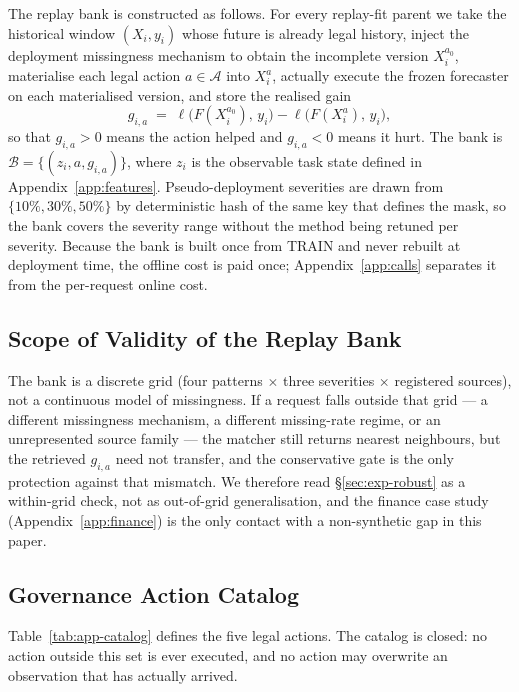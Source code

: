 \documentclass{article}
\newcommand{\calA}{\mathcal{A}}
\newcommand{\calB}{\mathcal{B}}
\newcommand{\loss}{\ell}
\begin{document}
The replay bank is constructed as follows. For every replay-fit parent we take the
historical window $(X_i, y_i)$ whose future is already legal history, inject the deployment
missingness mechanism to obtain the incomplete version $X_i^{a_0}$, materialise each legal
action $a \in \calA$ into $X_i^{a}$, actually execute the frozen forecaster on each
materialised version, and store the realised gain
\begin{equation}
  g_{i,a} \;=\; \loss\big(F(X_i^{a_0}),\, y_i\big) - \loss\big(F(X_i^{a}),\, y_i\big),
  \label{eq:app-gain}
\end{equation}
so that $g_{i,a} > 0$ means the action helped and $g_{i,a} < 0$ means it hurt. The bank is
$\calB = \{(z_i, a, g_{i,a})\}$, where $z_i$ is the observable task state defined in
Appendix~\ref{app:features}. Pseudo-deployment severities are drawn from
$\{10\%, 30\%, 50\%\}$ by deterministic hash of the same key that defines the mask, so the
bank covers the severity range without the method being retuned per severity. Because the
bank is built once from TRAIN and never rebuilt at deployment time, the offline cost is
paid once; Appendix~\ref{app:calls} separates it from the per-request online cost.

\subsection{Scope of Validity of the Replay Bank}
\label{app:scope}

The bank is a discrete grid (four patterns $\times$ three severities $\times$ registered
sources), not a continuous model of missingness. If a request falls outside that grid --- a
different missingness mechanism, a different missing-rate regime, or an unrepresented source
family --- the matcher still returns nearest neighbours, but the retrieved $g_{i,a}$ need
not transfer, and the conservative gate is the only protection against that mismatch. We
therefore read \S\ref{sec:exp-robust} as a within-grid check, not as out-of-grid
generalisation, and the finance case study (Appendix~\ref{app:finance}) is the only contact
with a non-synthetic gap in this paper.

\subsection{Governance Action Catalog}
\label{app:catalog}
Table~\ref{tab:app-catalog} defines the five legal actions. The catalog is closed: no
action outside this set is ever executed, and no action may overwrite an observation that
has actually arrived.
\end{document}
